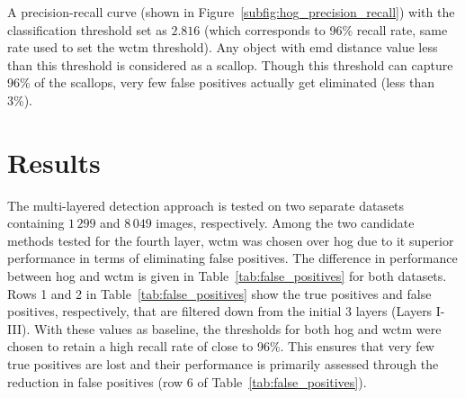 A precision-recall curve (shown in Figure~\ref{subfig:hog_precision_recall}) with the classification threshold set as $2.816$ (which corresponds to 96\% recall rate, same rate used to set the \gls{wctm} threshold). 
Any object with \gls{emd} distance value less than this threshold is considered as a scallop.
 Though this threshold can capture 96\% of the scallops, very few false positives actually get eliminated (less than 3\%).

\section{Results}
%
The multi-layered detection approach is tested on two separate datasets containing  $1\,299$ and $8\,049$ images, respectively.
Among the two candidate methods tested for the fourth layer, \gls{wctm} was chosen over \gls{hog} due to it superior performance in terms of eliminating false positives. 
The difference in performance between \gls{hog} and \gls{wctm} is given in Table~\ref{tab:false_positives} for both datasets. 
Rows 1 and 2 in Table~\ref{tab:false_positives} show the true positives and false positives, respectively, that are filtered down from the initial 3 layers (Layers I-III). 
With these values as baseline, the thresholds for both \gls{hog} and \gls{wctm} were chosen to retain a high recall rate of close to 96\%. 
This ensures that very few true positives are lost and their performance is primarily assessed through the reduction in false positives (row 6 of Table~\ref{tab:false_positives}). 

